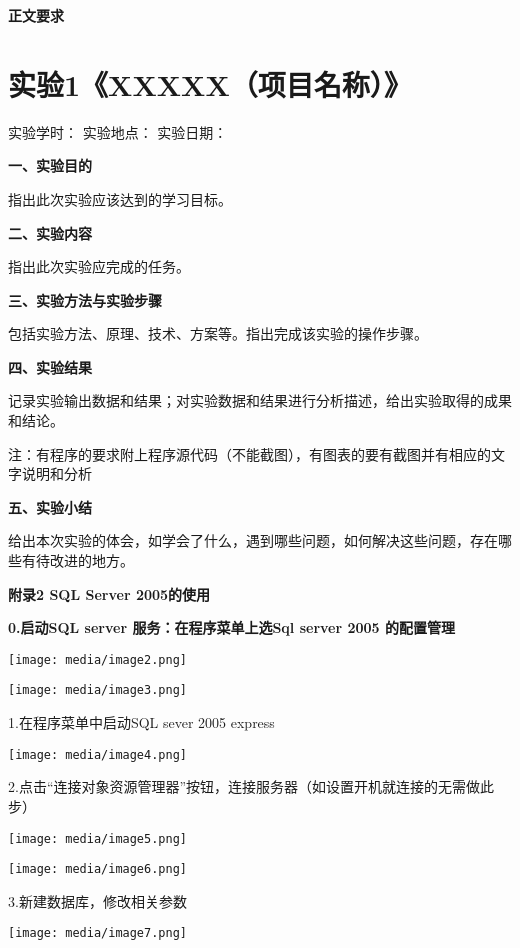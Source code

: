 \documentclass[
]{article}
\begin{document}
\textbf{正文要求}

\hypertarget{ux5b9eux9a8c1xxxxxux9879ux76eeux540dux79f0}{%
\section{实验1《XXXXX（项目名称）》}\label{ux5b9eux9a8c1xxxxxux9879ux76eeux540dux79f0}}

实验学时： { } 实验地点： { } 实验日期： { }

{}

\textbf{一、实验目的}

指出此次实验应该达到的学习目标。

\textbf{二、实验内容}

指出此次实验应完成的任务。

\textbf{三、实验方法与实验步骤}

包括实验方法、原理、技术、方案等。指出完成该实验的操作步骤。

\textbf{四、实验结果}

记录实验输出数据和结果；对实验数据和结果进行分析描述，给出实验取得的成果和结论。

注：有程序的要求附上程序源代码（不能截图），有图表的要有截图并有相应的文字说明和分析

\textbf{五、实验小结}

给出本次实验的体会，如学会了什么，遇到哪些问题，如何解决这些问题，存在哪些有待改进的地方。

\textbf{附录2 SQL Server 2005的使用}

\textbf{0.启动SQL server 服务：在程序菜单上选Sql server 2005 的配置管理}

\texttt{[image: media/image2.png]}

\texttt{[image: media/image3.png]}

1.在程序菜单中启动SQL sever 2005 express

\texttt{[image: media/image4.png]}

2.点击``连接对象资源管理器''按钮，连接服务器（如设置开机就连接的无需做此步）

\texttt{[image: media/image5.png]}

\texttt{[image: media/image6.png]}

3.新建数据库，修改相关参数

\texttt{[image: media/image7.png]}
\end{document}
